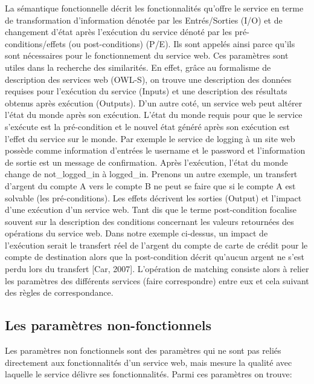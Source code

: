   La sémantique fonctionnelle décrit les fonctionnalités qu’offre le
  service en terme de transformation d’information dénotée par les
  Entrés/Sorties (I/O) et de changement d’état après l’exécution du
  service dénoté par les pré-conditions/effets (ou post-conditions)
  (P/E).  Ils sont appelés ainsi parce qu’ils sont nécessaires pour le
  fonctionnement du service web. Ces paramètres sont utiles dans la
  recherche des similarités. En effet, grâce au formalisme de
  description des services web (OWL-S), on trouve une description des
  données requises pour l’exécution du service (Inputs) et une
  description des résultats obtenus après exécution (Outputs). D’un
  autre coté, un service web peut altérer l’état du monde après son
  exécution.  L’état du monde requis pour que le service s’exécute est
  la pré-condition et le nouvel état généré après son exécution est
  l’effet du service sur le monde. Par exemple le service de logging à
  un site web possède comme information d’entrées le username et le
  password et l’information de sortie est un message de
  confirmation. Après l’exécution, l’état du monde change de
  not\_logged\_in à logged\_in. Prenons un autre exemple, un transfert
  d’argent du compte A vers le compte B ne peut se faire que si le
  compte A est solvable (les pré-conditions).  Les effets décrivent
  les sorties (Output) et l’impact d’une exécution d’un service
  web. Tant dis que le terme post-condition focalise souvent sur la
  description des conditions concernant les valeurs retournées des
  opérations du service web. Dans notre exemple ci-dessus, un impact
  de l'exécution serait le transfert réel de l'argent du compte de
  carte de crédit pour le compte de destination alors que la
  post-condition décrit qu'aucun argent ne s’est perdu lors du
  transfert [Car, 2007].  L’opération de matching consiste alors à
  relier les paramètres des différents services (faire correspondre)
  entre eux et cela suivant des règles de correspondance.

  \subsection{Les paramètres non-fonctionnels}
  \label{sec:params-non-fonc}

  Les paramètres non fonctionnels sont des paramètres qui ne sont pas
  reliés directement aux fonctionnalités d’un service web, mais mesure
  la qualité avec laquelle le service délivre ses
  fonctionnalités. Parmi ces paramètres on trouve:

